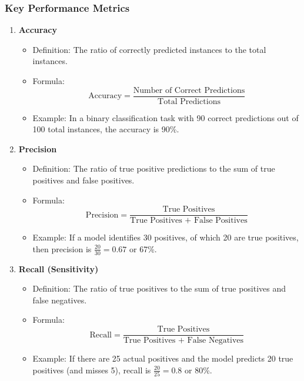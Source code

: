 \documentclass[aspectratio=169]{beamer}
\begin{document}
\begin{frame}[fragile]
    \frametitle{Key Performance Metrics}
    \begin{enumerate}
        \item \textbf{Accuracy}
        \begin{itemize}
            \item Definition: The ratio of correctly predicted instances to the total instances.
            \item Formula: 
            \begin{equation}
                \text{Accuracy} = \frac{\text{Number of Correct Predictions}}{\text{Total Predictions}}
            \end{equation}
            \item Example: In a binary classification task with 90 correct predictions out of 100 total instances, the accuracy is 90\%.
        \end{itemize}
        
        \item \textbf{Precision}
        \begin{itemize}
            \item Definition: The ratio of true positive predictions to the sum of true positives and false positives.
            \item Formula:
            \begin{equation}
                \text{Precision} = \frac{\text{True Positives}}{\text{True Positives + False Positives}}
            \end{equation}
            \item Example: If a model identifies 30 positives, of which 20 are true positives, then precision is \( \frac{20}{30} = 0.67\) or 67\%.
        \end{itemize}

        \item \textbf{Recall (Sensitivity)}
        \begin{itemize}
            \item Definition: The ratio of true positives to the sum of true positives and false negatives.
            \item Formula:
            \begin{equation}
                \text{Recall} = \frac{\text{True Positives}}{\text{True Positives + False Negatives}}
            \end{equation}
            \item Example: If there are 25 actual positives and the model predicts 20 true positives (and misses 5), recall is \( \frac{20}{25} = 0.8\) or 80\%.
        \end{itemize}
        

\end{enumerate}
\end{frame}
\end{document}
